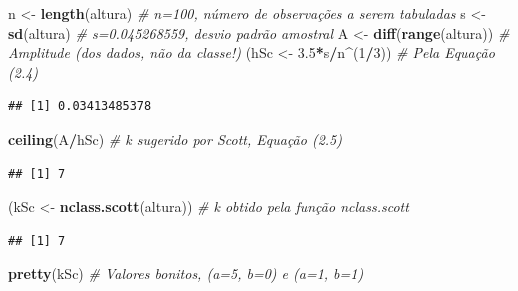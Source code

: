 \documentclass[
]{book}
\newenvironment{Shaded}{\begin{snugshade}}{\end{snugshade}}
\newcommand{\CommentTok}[1]{\textcolor[rgb]{0.56,0.35,0.01}{\textit{#1}}}
\newcommand{\DecValTok}[1]{\textcolor[rgb]{0.00,0.00,0.81}{#1}}
\newcommand{\FloatTok}[1]{\textcolor[rgb]{0.00,0.00,0.81}{#1}}
\newcommand{\KeywordTok}[1]{\textcolor[rgb]{0.13,0.29,0.53}{\textbf{#1}}}
\newcommand{\NormalTok}[1]{#1}
\newcommand{\OperatorTok}[1]{\textcolor[rgb]{0.81,0.36,0.00}{\textbf{#1}}}
\newcommand{\StringTok}[1]{\textcolor[rgb]{0.31,0.60,0.02}{#1}}
\theoremstyle{definition}
\theoremstyle{definition}
\theoremstyle{definition}
\theoremstyle{remark}
\begin{document}
\begin{Shaded}
\begin{Highlighting}[]
\NormalTok{n \textless{}{-}}\StringTok{ }\KeywordTok{length}\NormalTok{(altura)                   }\CommentTok{\# n=100, número de observações a serem tabuladas}
\NormalTok{s \textless{}{-}}\StringTok{ }\KeywordTok{sd}\NormalTok{(altura)                       }\CommentTok{\# s=0.045268559, desvio padrão amostral}
\NormalTok{A \textless{}{-}}\StringTok{ }\KeywordTok{diff}\NormalTok{(}\KeywordTok{range}\NormalTok{(altura))              }\CommentTok{\# Amplitude (dos dados, não da classe!)}
\NormalTok{(hSc \textless{}{-}}\StringTok{ }\FloatTok{3.5}\OperatorTok{*}\NormalTok{s}\OperatorTok{/}\NormalTok{n}\OperatorTok{\^{}}\NormalTok{(}\DecValTok{1}\OperatorTok{/}\DecValTok{3}\NormalTok{))                }\CommentTok{\# Pela Equação (2.4)}
\end{Highlighting}
\end{Shaded}

\begin{verbatim}
## [1] 0.03413485378
\end{verbatim}

\begin{Shaded}
\begin{Highlighting}[]
\KeywordTok{ceiling}\NormalTok{(A}\OperatorTok{/}\NormalTok{hSc)                        }\CommentTok{\# k sugerido por Scott, Equação (2.5)}
\end{Highlighting}
\end{Shaded}

\begin{verbatim}
## [1] 7
\end{verbatim}

\begin{Shaded}
\begin{Highlighting}[]
\NormalTok{(kSc \textless{}{-}}\StringTok{ }\KeywordTok{nclass.scott}\NormalTok{(altura))         }\CommentTok{\# k obtido pela função \textquotesingle{}nclass.scott\textquotesingle{}}
\end{Highlighting}
\end{Shaded}

\begin{verbatim}
## [1] 7
\end{verbatim}

\begin{Shaded}
\begin{Highlighting}[]
\KeywordTok{pretty}\NormalTok{(kSc)                           }\CommentTok{\# Valores \textquotesingle{}bonitos\textquotesingle{}, (a=5, b=0) e (a=1, b=1)}
\end{Highlighting}
\end{Shaded}
\end{document}
